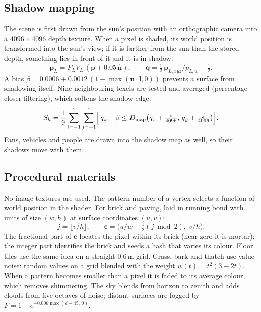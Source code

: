 \documentclass[11pt,a4paper]{article}
\newcommand{\vect}[1]{\mathbf{#1}}
\begin{document}
\subsection{Shadow mapping}
The scene is first drawn from the sun's position with an orthographic
camera into a $4096\times4096$ depth texture. When a pixel is shaded, its
world position is transformed into the sun's view; if it is farther from
the sun than the stored depth, something lies in front of it and it is in
shadow:
\begin{equation}
\vect p_L=P_LV_L\,(\vect p+0.05\,\hat{\vect n}),\qquad
\vect q=\tfrac12\,\vect p_{L,xyz}/p_{L,w}+\tfrac12 .
\end{equation}
A bias $\beta=0.0006+0.0012\,(1-\max(\vect n\cdot\vect l,0))$ prevents a
surface from shadowing itself. Nine neighbouring texels are tested and
averaged (percentage-closer filtering), which softens the shadow edge:
\begin{equation}
S_h=\frac19\sum_{i=-1}^{1}\sum_{j=-1}^{1}
\Bigl[\,q_z-\beta\le D_{\mathrm{map}}\bigl(q_x+\tfrac{i}{4096},\,q_y+\tfrac{j}{4096}\bigr)\Bigr].
\end{equation}
Fans, vehicles and people are drawn into the shadow map as well, so their
shadows move with them.

\subsection{Procedural materials}
No image textures are used. The pattern number of a vertex selects a
function of world position in the shader. For brick and paving, laid in
running bond with units of size $(w,h)$ at surface coordinates $(u,v)$:
\begin{equation}
j=\lfloor v/h\rfloor,\qquad
\vect c=\bigl(u/w+\tfrac12(j\bmod2),\;v/h\bigr).
\end{equation}
The fractional part of $\vect c$ locates the pixel within its brick (near
zero it is mortar); the integer part identifies the brick and seeds a hash
that varies its colour. Floor tiles use the same idea on a straight
$0.6$\,m grid. Grass, bark and thatch use value noise: random values on a
grid blended with the weight $w(t)=t^{2}(3-2t)$. When a pattern becomes
smaller than a pixel it is faded to its average colour, which removes
shimmering. The sky blends from horizon to zenith and adds clouds from five
octaves of noise; distant surfaces are fogged by
$F=1-e^{-0.006\max(d-45,\,0)}$.
\end{document}

